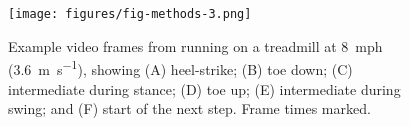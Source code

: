 \begin{figure}
\begin{center}
\texttt{[image: figures/fig-methods-3.png]}
\end{center}
\caption{Example video frames from running on a treadmill at \SI{8}{mph} (\SI{3.6}{\meter\per\second}), showing (A) heel-strike; (B) toe down; (C) intermediate during stance; (D) toe up; (E) intermediate during swing; and (F) start of the next step. Frame times marked.} 
\label{fig:methods:dltdv8-2}
\end{figure}


